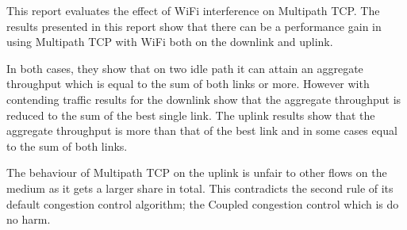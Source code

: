This report evaluates the effect of WiFi interference on Multipath TCP. 
The results presented in this report show that there can be a performance gain 
in using Multipath TCP with WiFi both on the downlink and uplink.

In both cases, they show that on two idle path it can attain an aggregate
throughput which is equal to the sum of both links or more. However with 
contending traffic results for the downlink show that the aggregate throughput 
is reduced to the sum of the best single link. The uplink results show that the 
aggregate throughput is more than that of the best link and in some cases equal 
to the sum of both links.

The behaviour of Multipath TCP on the uplink is unfair to other flows on the 
medium as it gets a larger share in total. This contradicts the second rule of 
its default congestion control algorithm; the Coupled congestion control which 
is do no harm. 

